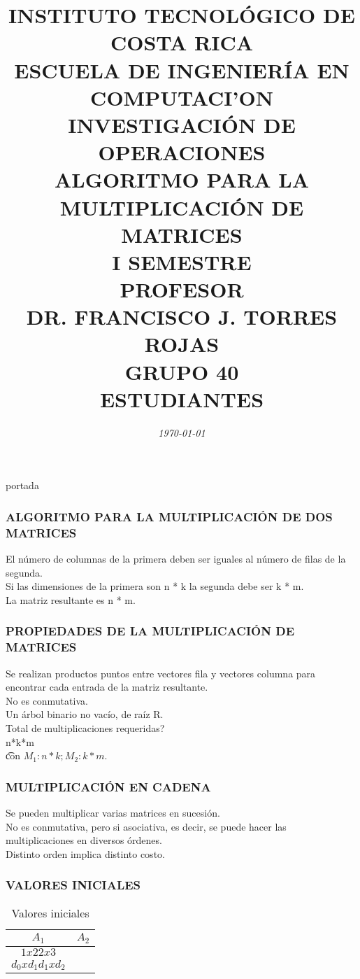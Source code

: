 \documentclass[10]{beamer}
\title{{\color{WHITE} \large \textbf{INSTITUTO TECNOL\'OGICO DE COSTA RICA}} \\ \vspace{0.02cm} 
{\color{WHITE} \large \textbf{ESCUELA DE INGENIER\'IA EN COMPUTACI'ON }} \\ \vspace{0.02cm} 
{\color{WHITE} \large \textbf{INVESTIGACI\'ON DE OPERACIONES  }} \\ \vspace{0.02cm} 
{\color{WHITE} \large \textbf{ALGORITMO PARA LA \\ MULTIPLICACI\'ON DE MATRICES  }} \\ \vspace{0.02cm} 
{\color{WHITE} \large \textbf{I SEMESTRE  }}\\ \vspace{0.02cm}
{\color{WHITE} \large \textbf{PROFESOR}} \\ \vspace{0.02cm}
{\color{WHITE} \large DR. FRANCISCO J. TORRES ROJAS  } \\ \vspace{0.02cm}
{\color{WHITE} \large \textbf{GRUPO 40}} \\ \vspace{0.01cm}
{\color{WHITE} \large \textbf{ESTUDIANTES} }}
\date{\em \color{WHITE} \today}
\begin{document}
\begin{frame}
\color{white}
\titlepage portada
\end{frame} 
\begin{frame}
\color{white}
\frametitle{ALGORITMO PARA LA MULTIPLICACI\'ON DE DOS MATRICES}
El n\'umero de columnas de la primera deben ser iguales al n\'umero de filas de la segunda.
\\ Si las dimensiones de la primera son n * k la segunda debe ser k * m.
\\ La matriz resultante es n * m.
\end{frame} 
\begin{frame}
\color{white}
\frametitle{PROPIEDADES DE LA MULTIPLICACI\'ON DE MATRICES}
Se realizan productos puntos entre vectores fila y vectores columna para encontrar cada entrada de la matriz resultante.
\\ No es conmutativa.
\\Un \'arbol binario no vac\'io, de ra\'iz R.
\\ Total de multiplicaciones requeridas? \\ n*k*m  \\ \t con $M_1:n*k; M_2: k*m$.
\end{frame} 
\begin{frame}
\color{white}
\frametitle{MULTIPLICACI\'ON EN CADENA}
Se pueden multiplicar varias matrices en sucesi\'on.
\\ No es conmutativa, pero si asociativa, es decir, se puede hacer las multiplicaciones en diversos \'ordenes.
\\ Distinto orden implica distinto costo.
\end{frame} 
\begin{frame}\frametitle{VALORES INICIALES}
 \color{white}
\begin{table}
 \begin{tabular}{ c | c }
 \\  $A_1$ & $A_2$  \\ 
 \hline \hline 
 $1x2$$2x3$ \\ 
 $d_0xd_1$$d_1xd_2$ 
 \end{tabular}
 \color{white}
\caption{Valores iniciales}
 \end{table}
 \end{frame} 
\end{document}
